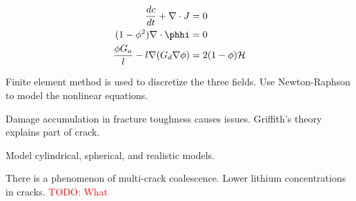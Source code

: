 \documentclass[book.tex]{subfiles}
\begin{document}
\begin{align}
\frac{dc}{dt} + \nabla \cdot J &= 0 \\
(1 - \phi^2)\nabla \cdot \phhi &= 0 \\
\frac{\phi G_a}{l} - l \nabla (G_d \nabla \phi) &= 2(1 - \phi) \mathcal{H} \\
\end{align}

Finite element method is used to discretize the three fields. Use Newton-Raphson to model the nonlinear equations. 

Damage accumulation in fracture toughness causes issues. Griffith's theory explains part of crack.

Model cylindrical, spherical, and realistic models.

There is a phenomenon of multi-crack coalescence. Lower lithium concentrations in cracks. \textcolor{red}{TODO: What }
\end{document}
